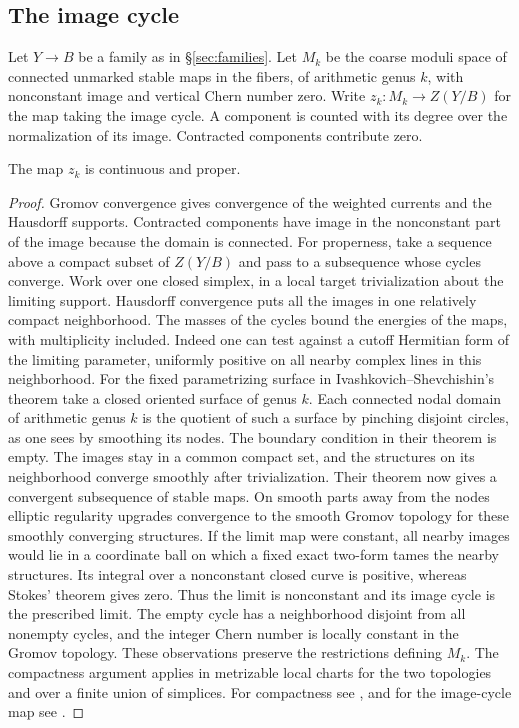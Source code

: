 \subsection{The image cycle}
Let $Y\to B$ be a family as in \S\ref{sec:families}. Let $M_k$ be
the coarse moduli space of connected unmarked stable maps in the fibers,
of arithmetic genus $k$, with nonconstant image and vertical Chern number
zero. Write $z_k:M_k\to Z(Y/B)$ for the map taking the image cycle.
A component is counted with its degree over the normalization of its
image. Contracted components contribute zero.
\begin{lemma}\label{lem:proper}
The map $z_k$ is continuous and proper.
\end{lemma}
\begin{proof}
Gromov convergence gives convergence of the weighted currents and the
Hausdorff supports. Contracted components have image in the nonconstant part of the
image because the domain is connected. For properness, take a
sequence above a compact subset of $Z(Y/B)$ and pass to a subsequence whose
cycles converge. Work over one closed simplex, in a local target
trivialization about the limiting support. Hausdorff convergence puts
all the images in one relatively compact neighborhood. The masses of
the cycles bound the energies of the maps, with multiplicity included.
Indeed one can test against a cutoff Hermitian form of the limiting
parameter, uniformly positive on all nearby complex lines in this
neighborhood. For the fixed parametrizing surface in
Ivashkovich--Shevchishin's theorem take a closed oriented surface
of genus $k$. Each connected nodal domain of arithmetic genus $k$
is the quotient of such a surface by pinching disjoint circles,
as one sees by smoothing its nodes. The boundary condition in
their theorem is empty. The images stay in a common compact set,
and the structures on its neighborhood converge smoothly after
trivialization. Their theorem now gives a convergent subsequence
of stable maps. On smooth parts away from the nodes elliptic
regularity upgrades convergence to the smooth Gromov topology for
these smoothly converging structures. If the limit map were constant,
all nearby images would lie in a coordinate ball on which a fixed
exact two-form tames the nearby structures. Its integral over a
nonconstant closed curve is positive, whereas Stokes' theorem gives
zero. Thus the limit is nonconstant and its image cycle is the
prescribed limit. The empty cycle has a neighborhood disjoint from
all nonempty cycles, and the integer Chern number is locally constant
in the Gromov topology. These observations preserve the restrictions
defining $M_k$. The compactness argument applies in metrizable local
charts for the two topologies and over a finite union of simplices.
For compactness see \cite[Theorem~1.1]{IS}, and for the image-cycle map see \cite[Definition~2.14]{DIW}.
\end{proof}

